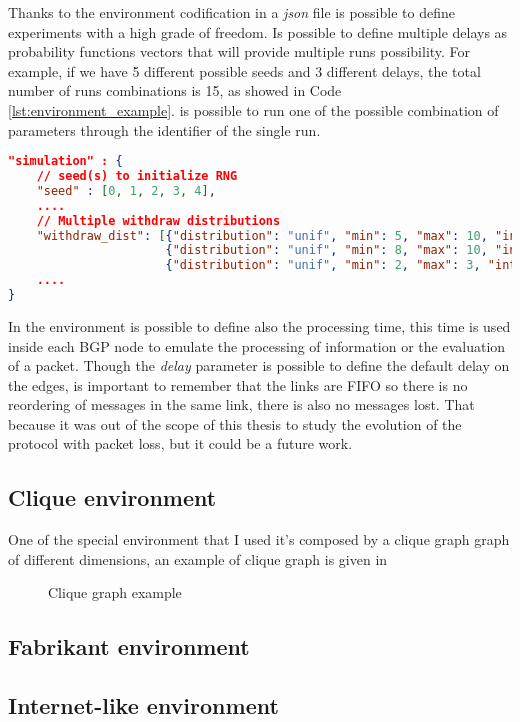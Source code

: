 Thanks to the environment codification in a \textit{json} file is possible to
define experiments with a high grade of freedom.
Is possible to define multiple delays as probability functions vectors that
will provide multiple runs possibility. For example, if we have \num{5} different
possible seeds and \num{3} different delays, the total number of runs combinations
is \num{15}, as showed in Code \ref{lst:environment_example}.
is possible to run one of the possible combination of parameters through the identifier
of the single run.

\begin{lstlisting}[language=json, caption=Environment example, label=lst:environment_example]
"simulation" : {                                                              
    // seed(s) to initialize RNG                                      
    "seed" : [0, 1, 2, 3, 4], 
    ....
    // Multiple withdraw distributions
    "withdraw_dist": [{"distribution": "unif", "min": 5, "max": 10, "int": 0.1},
                      {"distribution": "unif", "min": 8, "max": 10, "int": 0.1},
                      {"distribution": "unif", "min": 2, "max": 3, "int": 0.1}],       
    ....
}
\end{lstlisting}

In the environment is possible to define also the processing time, this time is used
inside each \ac{BGP} node to emulate the processing of information or the evaluation
of a packet.
Though the \textit{delay} parameter is possible to define the default delay on the edges,
is important to remember that the links are FIFO so there is no reordering
of messages in the same link, there is also no messages lost.
That because it was out of the scope of this thesis to study the evolution
of the protocol with packet loss, but it could be a future work.

\subsection{Clique environment}
\label{subsec:clique_env}

One of the special environment that I used it's composed by a clique graph
graph of different dimensions, an example of clique graph is given in

\begin{figure}[h]                                                               
    \begin{center}                                                              
        
    \end{center}                                                                
    \caption{Clique graph example}                                
    \label{fig:clique_graph}
\end{figure}

\subsection{Fabrikant environment}
\label{subsec:fabrikant_env}

\subsection{Internet-like environment}
\label{subsec:internet_like_env}